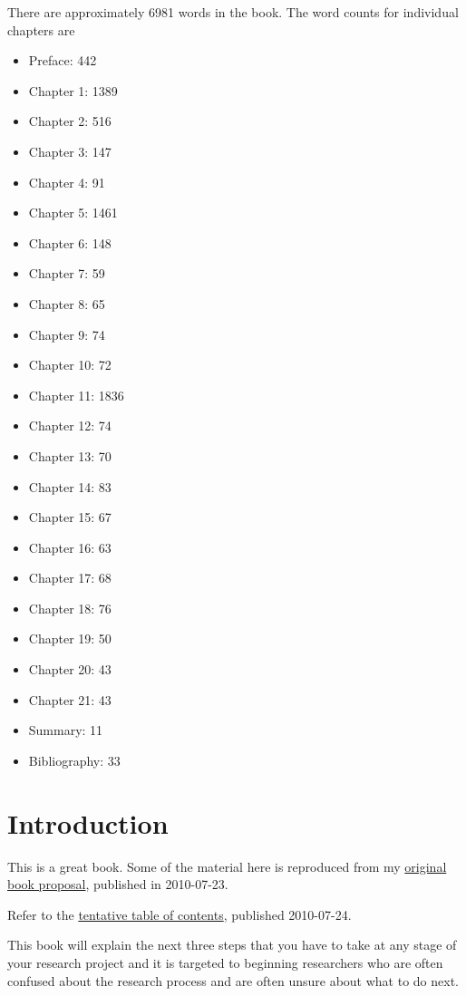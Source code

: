 \documentclass[
  letterpaper,
  DIV=11,
  numbers=noendperiod]{scrreprt}
\providecommand{\tightlist}{%
  \setlength{\itemsep}{0pt}\setlength{\parskip}{0pt}}\usepackage{longtable,booktabs,array}
\begin{document}
There are approximately 6981 words in the book. The word counts for
individual chapters are

\begin{itemize}
\tightlist
\item
  Preface: 442
\item
  Chapter 1: 1389
\item
  Chapter 2: 516
\item
  Chapter 3: 147
\item
  Chapter 4: 91
\item
  Chapter 5: 1461
\item
  Chapter 6: 148
\item
  Chapter 7: 59
\item
  Chapter 8: 65
\item
  Chapter 9: 74
\item
  Chapter 10: 72
\item
  Chapter 11: 1836
\item
  Chapter 12: 74
\item
  Chapter 13: 70
\item
  Chapter 14: 83
\item
  Chapter 15: 67
\item
  Chapter 16: 63
\item
  Chapter 17: 68
\item
  Chapter 18: 76
\item
  Chapter 19: 50
\item
  Chapter 20: 43
\item
  Chapter 21: 43
\item
  Summary: 11
\item
  Bibliography: 33
\end{itemize}


\chapter{Introduction}\label{introduction}

This is a great book. Some of the material here is reproduced from my
\href{http://www.pmean.com/10/SecondBook.html}{original book proposal},
published in 2010-07-23.

Refer to the \href{http://www.pmean.com/10/Contents.html}{tentative
table of contents}, published 2010-07-24.

This book will explain the next three steps that you have to take at any
stage of your research project and it is targeted to beginning
researchers who are often confused about the research process and are
often unsure about what to do next.
\end{document}
